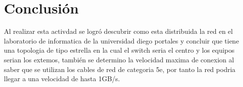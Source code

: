 \documentclass[spanish]{udpreport}
\begin{document}
\chapter{Conclusión}

Al realizar esta activdad se logró descubrir como esta distribuida la red en el laboratorio de informatica de la universidad diego portales y concluir que tiene una topologia de tipo estrella en la cual el switch seria el centro y los equipos serian los extemos, también se determino la velocidad maxima de conexion al saber que se utilizan los cables de red de categoria 5e, por tanto la red podria llegar a una velocidad de hasta 1GB/s.
\end{document}
